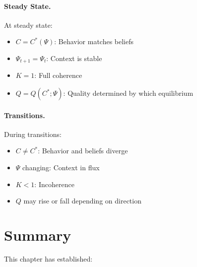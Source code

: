 \paragraph{Steady State.}
At steady state:
\begin{itemize}[nosep]
  \item $C = C^*(\Psi)$: Behavior matches beliefs
  \item $\Psi_{t+1} = \Psi_t$: Context is stable
  \item $K = 1$: Full coherence
  \item $Q = Q(C^*; \Psi)$: Quality determined by which equilibrium
\end{itemize}

\paragraph{Transitions.}
During transitions:
\begin{itemize}[nosep]
  \item $C \neq C^*$: Behavior and beliefs diverge
  \item $\Psi$ changing: Context in flux
  \item $K < 1$: Incoherence
  \item $Q$ may rise or fall depending on direction
\end{itemize}



\section{Summary}
\label{sec:context-summary}


This chapter has established:

